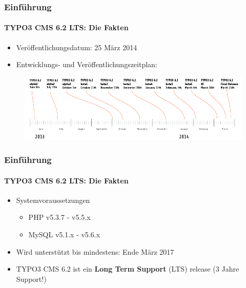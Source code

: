 \begin{frame}[fragile]

	\frametitle{Einführung}
	\framesubtitle{TYPO3 CMS 6.2 LTS: Die Fakten}

	\begin{itemize}
		\item Veröffentlichungsdatum: 25 März 2014
		\item Entwicklungs- und Veröffentlichungszeitplan:
	\end{itemize}

	\begin{figure}
		\includegraphics[width=0.99\linewidth]{Images/Introduction/ReleaseTimeline.png}
	\end{figure}

\end{frame}


\begin{frame}[fragile]
	\frametitle{Einführung}
	\framesubtitle{TYPO3 CMS 6.2 LTS: Die Fakten}

	\begin{itemize}
		\item Systemvoraussetzungen
		\begin{itemize}
			\item PHP	\tabto{1.2cm} v5.3.7 - v5.5.x
			\item MySQL	\tabto{1.2cm} v5.1.x - v5.6.x
		\end{itemize}
	\end{itemize}

	\begin{itemize}
		\item Wird unterstützt bis mindestens: Ende März 2017
		\item TYPO3 CMS 6.2 ist ein \textbf{Long Term Support} (LTS) release\newline
			(3 Jahre Support!)
	\end{itemize}

\end{frame}

